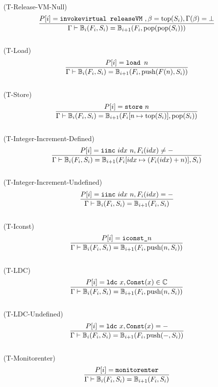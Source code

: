 \documentclass{amsart}
\newcommand{\C}{\mathbb{C}}
\newcommand{\bB}[1]{\mathbb{B}_{#1}}
\newcommand{\Const}{\texttt{Const}}
\numberwithin{equation}{section}
\theoremstyle{plain} %
\theoremstyle{definition}
\theoremstyle{remark}
\begin{document}
\\
(T-Release-VM-Null)
\begin{equation*}
\frac{P[i] = \text{\texttt{invokevirtual releaseVM} }, \beta = \text{top}(S_i), \Gamma(\beta) = \bot}
{\Gamma \vdash \bB{i}(F_i, S_i) = \bB{i+1}(F_i, \text{pop(pop}(S_i)))}
\end{equation*}
\\
(T-Load)
\begin{equation*}
\frac{P[i] = \text{\texttt{load }} n}
{\Gamma \vdash \bB{i}(F_i, S_i) = \bB{i+1}(F_i, \text{push}(F(n), S_i))}
\end{equation*}
\\
(T-Store)
\begin{equation*}
\frac{P[i] = \text{\texttt{store} } n}
{\Gamma \vdash \bB{i}(F_i, S_i) = \bB{i+1}(F_i[n \mapsto \text{top}(S_i)], \text{pop}(S_i))}
\end{equation*}
\\
(T-Integer-Increment-Defined)
\begin{equation*}
\frac{P[i] = \text{\texttt{iinc} } idx~n, F_i(idx) \neq -}
{\Gamma \vdash \bB{i}(F_i, S_i) = \bB{i+1}(F_i[idx \mapsto (F_i(idx) + n)], S_i)}
\end{equation*}
\\
(T-Integer-Increment-Undefined)
\begin{equation*}
\frac{P[i] = \text{\texttt{iinc} } idx~n, F_i(idx) = -}
{\Gamma \vdash \bB{i}(F_i, S_i) = \bB{i+1}(F_i, S_i)}
\end{equation*}
\\
(T-Iconst)
\begin{equation*}
\frac{P[i] = \text{\texttt{iconst\_}}n}
{\Gamma \vdash \bB{i}(F_i, S_i) = \bB{i+1}(F_i, \text{push}(n, S_i))}
\end{equation*}
\\
(T-LDC)
\begin{equation*}
\frac{P[i] = \text{\texttt{ldc} } x, \Const{}(x) \in \C{}}
{\Gamma \vdash \bB{i}(F_i, S_i) = \bB{i+1}(F_i, \text{push}(n, S_i))}
\end{equation*}
\\
(T-LDC-Undefined)
\begin{equation*}
\frac{P[i] = \text{\texttt{ldc} } x, \Const{}(x) = -}
{\Gamma \vdash \bB{i}(F_i, S_i) = \bB{i+1}(F_i, \text{push}(-, S_i))}
\end{equation*}
\\
(T-Monitorenter)
\begin{equation*}
\frac{P[i] = \text{\texttt{monitorenter}}}
{\Gamma \vdash \bB{i}(F_i, S_i) = \bB{i+1}(F_i, S_i)}
\end{equation*}
\end{document}
